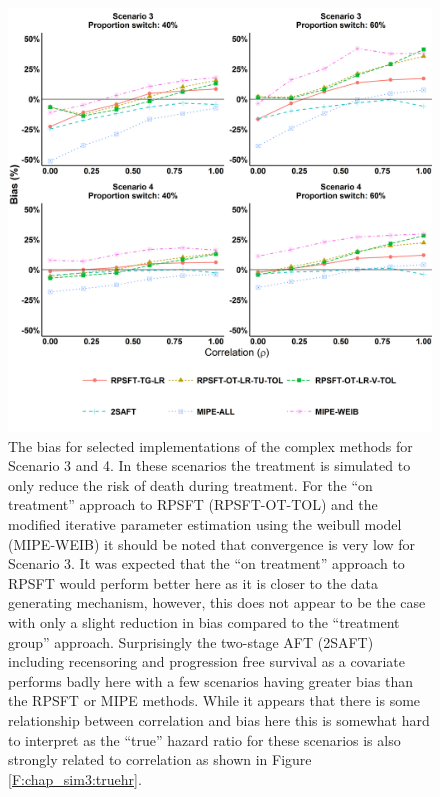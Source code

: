 \begin{figure}[ht]
\centering
\includegraphics[width=12cm]{images/chap_sim3/comp_bias34.png}
\caption{\label{F:chap_sim3:comp_bias34} The bias for selected implementations of the complex methods for Scenario 3 and 4. In these scenarios the treatment is simulated to only reduce the risk of death during treatment. For the ``on treatment'' approach to RPSFT (RPSFT-OT-TOL) and the modified iterative parameter estimation using the weibull model (MIPE-WEIB) it should be noted that convergence is very low for Scenario 3. It was expected that the ``on treatment'' approach to RPSFT would perform better here as it is closer to the data generating mechanism, however, this does not appear to be the case with only a slight reduction in bias compared to the ``treatment group'' approach. Surprisingly the two-stage AFT (2SAFT) including recensoring and progression free survival as a covariate performs badly here with a few scenarios having greater bias than the RPSFT or MIPE methods. While it appears that there is some relationship between correlation and bias here this is somewhat hard to interpret as the ``true'' hazard ratio for these scenarios is also strongly related to correlation as shown in Figure \ref{F:chap_sim3:truehr}.} 
\end{figure}


